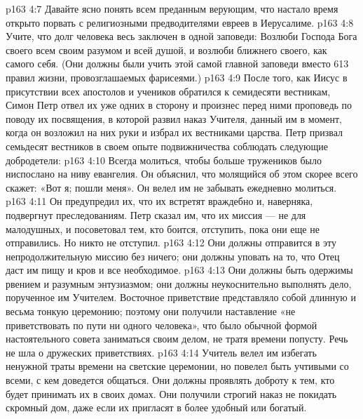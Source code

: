 \vs p163 4:7 \pc {}\bibnobreakspace Давайте ясно понять всем преданным верующим, что настало время открыто порвать с религиозными предводителями евреев в Иерусалиме.
\vs p163 4:8 \pc {}\bibnobreakspace Учите, что долг человека весь заключен в одной заповеди: Возлюби Господа Бога своего всем своим разумом и всей душой, и возлюби ближнего своего, как самого себя. (Они должны были учить этой самой главной заповеди вместо 613 правил жизни, провозглашаемых фарисеями.)
\vs p163 4:9 \pc После того, как Иисус в присутствии всех апостолов и учеников обратился к семидесяти вестникам, Симон Петр отвел их уже одних в сторону и произнес перед ними проповедь по поводу их посвящения, в которой развил наказ Учителя, данный им в момент, когда он возложил на них руки и избрал их вестниками царства. Петр призвал семьдесят вестников в своем опыте подвижничества соблюдать следующие добродетели:
\vs p163 4:10 \bibnobreakspace {} Всегда молиться, чтобы больше тружеников было ниспослано на ниву евангелия. Он объяснил, что молящийся об этом скорее всего скажет: «Вот я; пошли меня». Он велел им не забывать ежедневно молиться.
\vs p163 4:11 \pc {}\bibnobreakspace {} Он предупредил их, что их встретят враждебно и, наверняка, подвергнут преследованиям. Петр сказал им, что их миссия --- не для малодушных, и посоветовал тем, кто боится, отступить, пока они еще не отправились. Но никто не отступил.
\vs p163 4:12 \pc {}\bibnobreakspace {} Они должны отправится в эту непродолжительную миссию без ничего; они должны уповать на то, что Отец даст им пищу и кров и все необходимое.
\vs p163 4:13 \pc {}\bibnobreakspace {} Они должны быть одержимы рвением и разумным энтузиазмом; они должны неукоснительно выполнять дело, порученное им Учителем. Восточное приветствие представляло собой длинную и весьма тонкую церемонию; поэтому они получили наставление «не приветствовать по пути ни одного человека», что было обычной формой настоятельного совета заниматься своим делом, не тратя времени попусту. Речь не шла о дружеских приветствиях.
\vs p163 4:14 \pc {}\bibnobreakspace {} Учитель велел им избегать ненужной траты времени на светские церемонии, но повелел быть учтивыми со всеми, с кем доведется общаться. Они должны проявлять доброту к тем, кто будет принимать их в своих домах. Они получили строгий наказ не покидать скромный дом, даже если их пригласят в более удобный или богатый.
